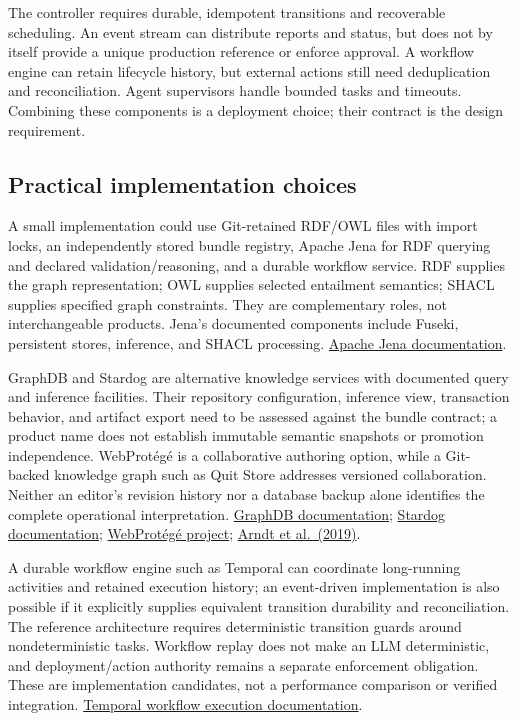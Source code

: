 \documentclass[preprint,12pt,authoryear]{elsarticle}
\begin{document}
The controller requires durable, idempotent transitions and recoverable
scheduling. An event stream can distribute reports and status, but does
not by itself provide a unique production reference or enforce approval.
A workflow engine can retain lifecycle history, but external actions
still need deduplication and reconciliation. Agent supervisors handle
bounded tasks and timeouts. Combining these components is a deployment
choice; their contract is the design requirement.

\subsection{Practical implementation
choices}\label{practical-implementation-choices}

A small implementation could use Git-retained RDF/OWL files with import
locks, an independently stored bundle registry, Apache Jena for RDF
querying and declared validation/reasoning, and a durable workflow
service. RDF supplies the graph representation; OWL supplies selected
entailment semantics; SHACL supplies specified graph constraints. They
are complementary roles, not interchangeable products. Jena's documented
components include Fuseki, persistent stores, inference, and SHACL
processing. \href{https://jena.apache.org/documentation/}{Apache Jena
documentation}.

GraphDB and Stardog are alternative knowledge services with documented
query and inference facilities. Their repository configuration,
inference view, transaction behavior, and artifact export need to be
assessed against the bundle contract; a product name does not establish
immutable semantic snapshots or promotion independence. WebProtégé is a
collaborative authoring option, while a Git-backed knowledge graph such
as Quit Store addresses versioned collaboration. Neither an editor's
revision history nor a database backup alone identifies the complete
operational interpretation.
\href{https://graphdb.ontotext.com/documentation/11.5/}{GraphDB
documentation}; \href{https://docs.stardog.com/}{Stardog documentation};
\href{https://protege.stanford.edu/software}{WebProtégé project};
\href{https://arxiv.org/abs/1805.03721}{Arndt et al.~(2019)}.

A durable workflow engine such as Temporal can coordinate long-running
activities and retained execution history; an event-driven
implementation is also possible if it explicitly supplies equivalent
transition durability and reconciliation. The reference architecture
requires deterministic transition guards around nondeterministic tasks.
Workflow replay does not make an LLM deterministic, and
deployment/action authority remains a separate enforcement obligation.
These are implementation candidates, not a performance comparison or
verified integration.
\href{https://docs.temporal.io/workflow-execution}{Temporal workflow
execution documentation}.
\end{document}

